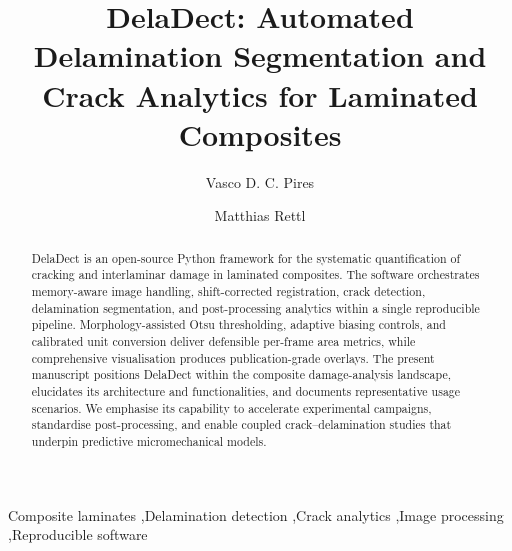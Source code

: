 \documentclass[preprint,12pt,a4paper]{elsarticle}
\begin{document}
\renewcommand{\labelenumii}{\arabic{enumi}.\arabic{enumii}}

\begin{frontmatter}

\title{DelaDect: Automated Delamination Segmentation and Crack Analytics for Laminated Composites}

\author[label1]{Vasco D. C. Pires}
\author[label2]{Matthias Rettl}
\address[label1]{Institute for Composite Structures, Technische Universit\"{a}t Graz, Kopernikusgasse 24/III, 8010 Graz, Austria; vasco.pires@tugraz.at}
\address[label2]{Centre for Advanced Materials, Montanuniversit\"{a}t Leoben, Franz-Josef-Stra\ss e 18, 8700 Leoben, Austria; matthias.rettl@unileoben.at}

\begin{abstract}
DelaDect is an open-source Python framework for the systematic quantification of cracking and
interlaminar damage in laminated composites. The software orchestrates memory-aware image handling,
shift-corrected registration, crack detection, delamination segmentation, and post-processing analytics
within a single reproducible pipeline. Morphology-assisted Otsu thresholding, adaptive biasing controls,
and calibrated unit conversion deliver defensible per-frame area metrics, while comprehensive
visualisation produces publication-grade overlays. The present manuscript positions DelaDect within the
composite damage-analysis landscape, elucidates its architecture and functionalities, and documents
representative usage scenarios. We emphasise its capability to accelerate experimental campaigns,
standardise post-processing, and enable coupled crack--delamination studies that underpin predictive
micromechanical models.
\end{abstract}

\begin{keyword}
Composite laminates \sep Delamination detection \sep Crack analytics \sep Image processing \sep Reproducible software
\end{keyword}

\end{frontmatter}
\end{document}
